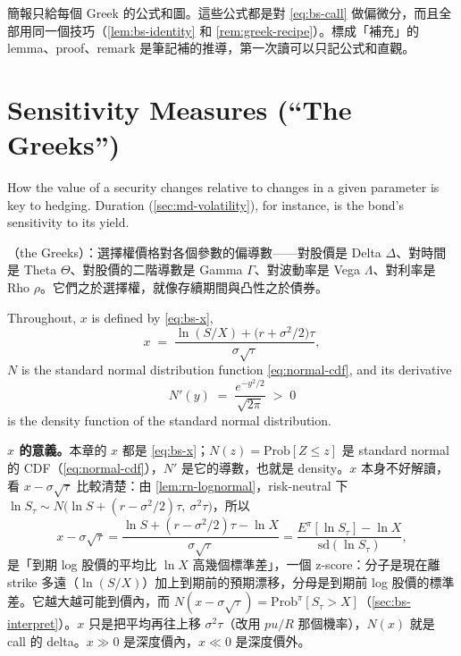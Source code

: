 
\begin{remark}[讀法]
	簡報只給每個 Greek 的公式和圖。這些公式都是對 \eqref{eq:bs-call} 做偏微分，而且全部用同一個技巧（\autoref{lem:bs-identity} 和 \autoref{rem:greek-recipe}）。標成「補充」的 lemma、proof、remark 是筆記補的推導，第一次讀可以只記公式和直觀。
\end{remark}
\suppend

\section{Sensitivity Measures (``The Greeks'')}
\label{sec:greeks}


How the value of a security changes relative to changes in a given parameter is key to hedging.
Duration (\autoref{sec:md-volatility}), for instance, is the bond's sensitivity to its yield.

\suppstart
{}

\begin{remark}
	（the Greeks）：選擇權價格對各個參數的偏導數——對股價是 Delta $\Delta$、對時間是 Theta $\Theta$、對股價的二階導數是 Gamma $\Gamma$、對波動率是 Vega $\Lambda$、對利率是 Rho $\rho$。它們之於選擇權，就像存續期間與凸性之於債券。
\end{remark}
\suppend

\begin{notation}
	Throughout, $x$ is defined by \eqref{eq:bs-x},
	\[
		x \;=\; \frac{\ln(S/X)+\bigl(r+\sigma^{2}/2\bigr)\tau}{\sigma\sqrt{\tau}} ,
	\]
	$N$ is the standard normal distribution function \eqref{eq:normal-cdf}, and its derivative
	\[
		N'(y) \;=\; \frac{e^{-y^{2}/2}}{\sqrt{2\pi}} \;>\; 0
	\]
	is the density function of the standard normal distribution.
\end{notation}

\suppstart
\begin{remark}
	\textbf{$x$ 的意義。}本章的 $x$ 都是 \eqref{eq:bs-x}；$N(z)=\mathrm{Prob}[Z\le z]$ 是 standard normal 的 CDF（\eqref{eq:normal-cdf}），$N'$ 是它的導數，也就是 density。$x$ 本身不好解讀，看 $x-\sigma\sqrt{\tau}$ 比較清楚：由 \autoref{lem:rn-lognormal}，risk-neutral 下 $\ln S_{\tau}\sim N\bigl(\ln S+(r-\sigma^{2}/2)\tau,\ \sigma^{2}\tau\bigr)$，所以
	\[
		x-\sigma\sqrt{\tau}=\frac{\ln S+(r-\sigma^{2}/2)\tau-\ln X}{\sigma\sqrt{\tau}}=\frac{E^{\pi}[\ln S_{\tau}]-\ln X}{\mathrm{sd}(\ln S_{\tau})} ,
	\]
	是「到期 log 股價的平均比 $\ln X$ 高幾個標準差」，一個 z-score：分子是現在離 strike 多遠（$\ln(S/X)$）加上到期前的預期漂移，分母是到期前 log 股價的標準差。它越大越可能到價內，而 $N(x-\sigma\sqrt{\tau})=\mathrm{Prob}^{\pi}[S_{\tau}>X]$（\autoref{sec:bs-interpret}）。$x$ 只是把平均再往上移 $\sigma^{2}\tau$（改用 $pu/R$ 那個機率），$N(x)$ 就是 call 的 delta。$x\gg0$ 是深度價內，$x\ll0$ 是深度價外。
\end{remark}


